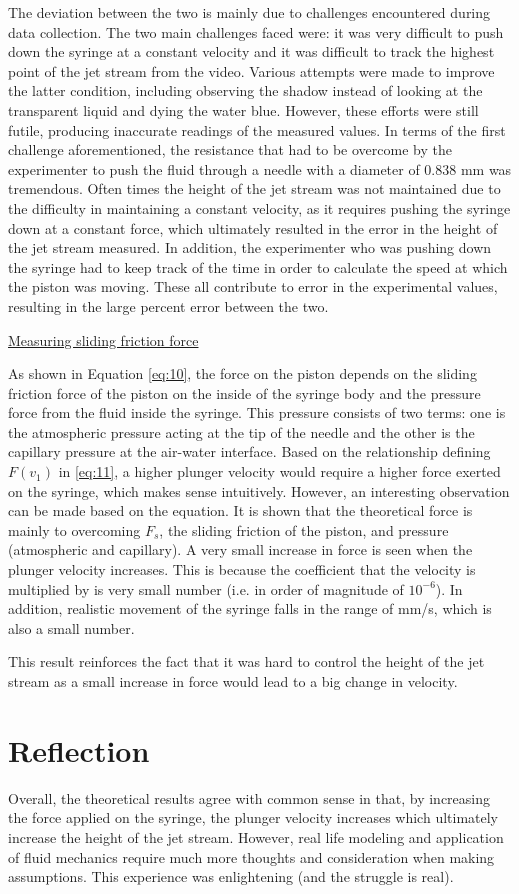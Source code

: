 \documentclass{article}
\begin{document}
The deviation between the two is mainly due to challenges encountered during data collection. The two main challenges faced were: it was very difficult to push down the syringe at a constant velocity and it was difficult to track the highest point of the jet stream from the video. Various attempts were made to improve the latter condition, including observing the shadow instead of looking at the transparent liquid and dying the water blue. However, these efforts were still futile, producing inaccurate readings of the measured values. In terms of the first challenge aforementioned, the resistance that had to be overcome by the experimenter to push the fluid through a needle with a diameter of 0.838 mm was tremendous. Often times the height of the jet stream was not maintained due to the difficulty in maintaining a constant velocity, as it requires pushing the syringe down at a constant force, which ultimately resulted in the error in the height of the jet stream measured. In addition, the experimenter who was pushing down the syringe had to keep track of the time in order to calculate the speed at which the piston was moving. These all contribute to error in the experimental values, resulting in the large percent error between the two.

\noindent\underline{Measuring sliding friction force}

As shown in Equation \ref{eq:10}, the force on the piston depends on the sliding friction force of the piston on the inside of the syringe body and the pressure force from the fluid inside the syringe. This pressure consists of two terms: one is the atmospheric pressure acting at the tip of the needle and the other is the capillary pressure at the air-water interface. Based on the relationship defining $F(v_{1})$ in \eqref{eq:11}, a higher plunger velocity would require a higher force exerted on the syringe, which makes sense intuitively. However, an interesting observation can be made based on the equation. It is shown that the theoretical force is mainly to overcoming $F_{s}$, the sliding friction of the piston, and pressure (atmospheric and capillary). A very small increase in force is seen when the plunger velocity increases. This is because the coefficient that the velocity is multiplied by is very small number (i.e. in order of magnitude of $10^{-6}$). In addition, realistic movement of the syringe falls in the range of mm/s, which is also a small number. 

This result reinforces the fact that it was hard to control the height of the jet stream as a small increase in force would lead to a big change in velocity. 

\section{Reflection}
Overall, the theoretical results agree with common sense in that, by increasing the force applied on the syringe, the plunger velocity increases which ultimately increase the height of the jet stream. However, real life modeling and application of fluid mechanics require much more thoughts and consideration when making assumptions. This experience was enlightening (and the struggle is real).


\setlength{\parindent}{1cm} 
\end{document}
